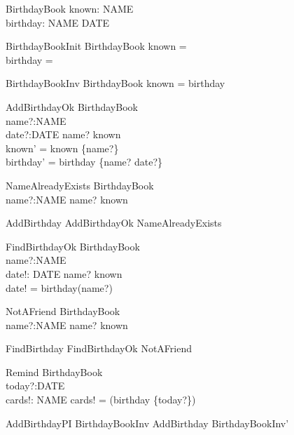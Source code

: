 \begin{zed}
\end{zed}

\begin{schema}{BirthdayBook}
known: \power NAME \\
birthday: NAME \pfun DATE
\end{schema}

\begin{schema}{BirthdayBookInit}
BirthdayBook
\where
known = \emptyset \\
birthday = \emptyset
\end{schema}

\begin{schema}{BirthdayBookInv}
BirthdayBook
\where
known = \dom birthday
\end{schema}

\begin{schema}{AddBirthdayOk}
\Delta BirthdayBook \\
name?:NAME \\
date?:DATE
\where
name? \notin known \\
known' = known \cup \{name?\} \\
birthday' = birthday \cup \{name? \mapsto date?\}
\end{schema}

\begin{schema}{NameAlreadyExists}
\Xi BirthdayBook \\
name?:NAME
\where
name? \in known
\end{schema}

\begin{zed}
AddBirthday  AddBirthdayOk \lor NameAlreadyExists
\end{zed}

\begin{schema}{FindBirthdayOk}
\Xi BirthdayBook \\
name?:NAME \\
date!: DATE
\where
name? \in known \\
date! = birthday(name?)
\end{schema}

\begin{schema}{NotAFriend}
\Xi BirthdayBook \\
name?:NAME
\where
name? \notin known
\end{schema}

\begin{zed}
FindBirthday  FindBirthdayOk \lor NotAFriend
\end{zed}

\begin{schema}{Remind}
\Xi BirthdayBook \\
today?:DATE \\
cards!: \power NAME
\where
cards! = \dom(birthday \rres \{today?\})
\end{schema}

\begin{theorem}{AddBirthdayPI}
BirthdayBookInv \land AddBirthday \implies BirthdayBookInv'
\end{theorem}


